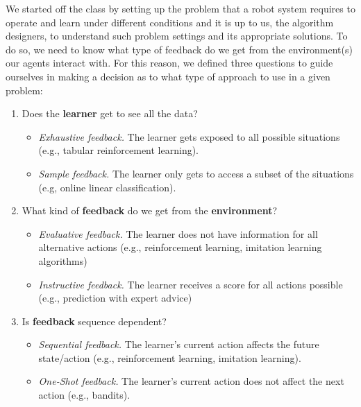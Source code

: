 \documentclass[11pt]{article}
\begin{document}
We started off the class by setting up the problem that a robot system requires to operate and learn under different conditions and it is up to us, the algorithm designers, to understand such problem settings and its appropriate solutions. To do so, we need to know what type of feedback do we get from the environment(s) our agents interact with. For this reason, we defined three questions to guide ourselves in making a decision as to what type of approach to use in a given problem:
\begin{enumerate}
    \item Does the \textbf{learner} get to see all the data?
    \begin{itemize}
        \item \textit{Exhaustive feedback.} The learner gets exposed to all possible situations (e.g., tabular reinforcement learning).
        \item \textit{Sample feedback.} The learner only gets to access a subset of the situations (e.g, online linear classification).
    \end{itemize}
    \item What kind of \textbf{feedback} do we get from the \textbf{environment}?
    \begin{itemize}
        \item \textit{Evaluative feedback.} The learner does not have information for all alternative actions (e.g., reinforcement learning, imitation learning algorithms)
        \item \textit{Instructive feedback.} The learner receives a score for all actions possible (e.g., prediction with expert advice)
    \end{itemize}
    \item Is \textbf{feedback} sequence dependent?
    \begin{itemize}
        \item \textit{Sequential feedback.} The learner's current action affects the future state/action (e.g., reinforcement learning, imitation learning).
        \item \textit{One-Shot feedback.} The learner's current action does not affect the next action (e.g., bandits).
    \end{itemize}
\end{enumerate}
\end{document}

